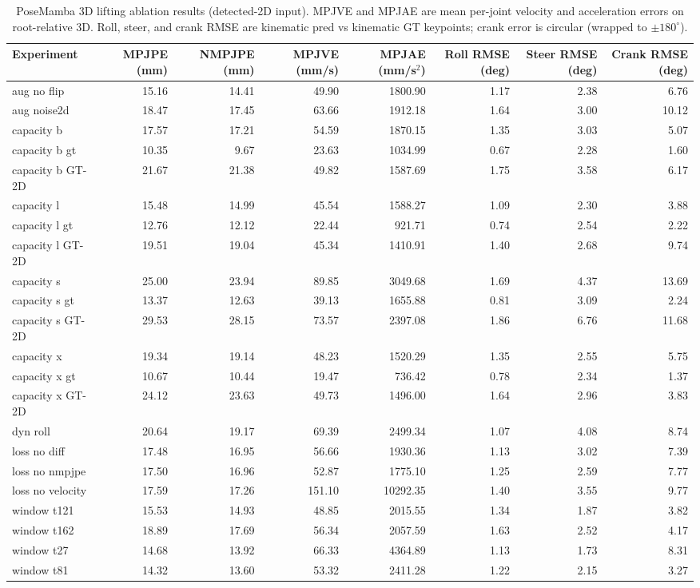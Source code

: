 \begin{table}[t]
\centering
\caption{PoseMamba 3D lifting ablation results (detected-2D input). MPJVE and MPJAE are mean per-joint velocity and acceleration errors on root-relative 3D. Roll, steer, and crank RMSE are kinematic pred vs kinematic GT keypoints; crank error is circular (wrapped to $\pm 180^\circ$).}
\begin{tabular}{lrrrrrrr}
\toprule
Experiment & MPJPE (mm) & NMPJPE (mm) & MPJVE (mm/s) & MPJAE (mm/s$^2$) & Roll RMSE (deg) & Steer RMSE (deg) & Crank RMSE (deg) \\
\midrule
aug no flip & 15.16 & 14.41 & 49.90 & 1800.90 & 1.17 & 2.38 & 6.76 \\
aug noise2d & 18.47 & 17.45 & 63.66 & 1912.18 & 1.64 & 3.00 & 10.12 \\
capacity b & 17.57 & 17.21 & 54.59 & 1870.15 & 1.35 & 3.03 & 5.07 \\
capacity b gt & 10.35 & 9.67 & 23.63 & 1034.99 & 0.67 & 2.28 & 1.60 \\
capacity b GT-2D & 21.67 & 21.38 & 49.82 & 1587.69 & 1.75 & 3.58 & 6.17 \\
capacity l & 15.48 & 14.99 & 45.54 & 1588.27 & 1.09 & 2.30 & 3.88 \\
capacity l gt & 12.76 & 12.12 & 22.44 & 921.71 & 0.74 & 2.54 & 2.22 \\
capacity l GT-2D & 19.51 & 19.04 & 45.34 & 1410.91 & 1.40 & 2.68 & 9.74 \\
capacity s & 25.00 & 23.94 & 89.85 & 3049.68 & 1.69 & 4.37 & 13.69 \\
capacity s gt & 13.37 & 12.63 & 39.13 & 1655.88 & 0.81 & 3.09 & 2.24 \\
capacity s GT-2D & 29.53 & 28.15 & 73.57 & 2397.08 & 1.86 & 6.76 & 11.68 \\
capacity x & 19.34 & 19.14 & 48.23 & 1520.29 & 1.35 & 2.55 & 5.75 \\
capacity x gt & 10.67 & 10.44 & 19.47 & 736.42 & 0.78 & 2.34 & 1.37 \\
capacity x GT-2D & 24.12 & 23.63 & 49.73 & 1496.00 & 1.64 & 2.96 & 3.83 \\
dyn roll & 20.64 & 19.17 & 69.39 & 2499.34 & 1.07 & 4.08 & 8.74 \\
loss no diff & 17.48 & 16.95 & 56.66 & 1930.36 & 1.13 & 3.02 & 7.39 \\
loss no nmpjpe & 17.50 & 16.96 & 52.87 & 1775.10 & 1.25 & 2.59 & 7.77 \\
loss no velocity & 17.59 & 17.26 & 151.10 & 10292.35 & 1.40 & 3.55 & 9.77 \\
window t121 & 15.53 & 14.93 & 48.85 & 2015.55 & 1.34 & 1.87 & 3.82 \\
window t162 & 18.89 & 17.69 & 56.34 & 2057.59 & 1.63 & 2.52 & 4.17 \\
window t27 & 14.68 & 13.92 & 66.33 & 4364.89 & 1.13 & 1.73 & 8.31 \\
window t81 & 14.32 & 13.60 & 53.32 & 2411.28 & 1.22 & 2.15 & 3.27 \\
\bottomrule
\end{tabular}
\end{table}